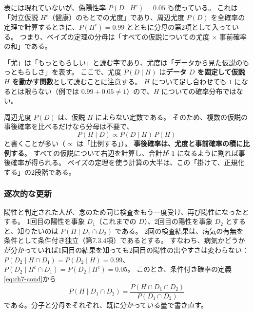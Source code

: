 表には現れていないが、偽陽性率 $P(D \mid H^c) = 0.05$ も使っている。
これは「対立仮説 $H^c$（健康）のもとでの尤度」であり、周辺尤度 $P(D)$ を全確率の定理で計算するときに、$P(H^c) = 0.99$ とともに分母の第2項として入っている。
つまり、ベイズの定理の分母は「すべての仮説についての尤度 $\times$ 事前確率の和」である。

「尤」は「もっともらしい」と読む字であり、尤度は「データから見た仮説のもっともらしさ」を表す。
ここで、尤度 $P(D \mid H)$ は\textbf{データ $D$ を固定して仮説 $H$ を動かす関数}として読むことに注意する。
$H$ について足し合わせても $1$ になるとは限らない（例では $0.99 + 0.05 \neq 1$）ので、$H$ についての確率分布ではない。

周辺尤度 $P(D)$ は、仮説 $H$ によらない定数である。
そのため、複数の仮説の事後確率を比べるだけなら分母は不要で、
\begin{equation}
  P(H \mid D) \propto P(D \mid H)\,P(H)
  \label{eq:ch7-bayes-prop}
\end{equation}
と書くことが多い（$\propto$ は「比例する」）。
\textbf{事後確率は、尤度と事前確率の積に比例する}。
すべての仮説について右辺を計算し、合計が $1$ になるように割れば事後確率が得られる。
ベイズの定理を使う計算の大半は、この「掛けて、正規化する」の2段階である。

\subsubsection{逐次的な更新}

陽性と判定された人が、念のため同じ検査をもう一度受け、再び陽性になったとする。
1回目の陽性を事象 $D_1$（これまでの $D$）、2回目の陽性を事象 $D_2$ とすると、知りたいのは $P(H \mid D_1 \cap D_2)$ である。
2回の検査結果は、病気の有無を条件として条件付き独立（第7.3.4項）であるとする。
すなわち、病気かどうかが分かっていれば1回目の結果を知っても2回目の陽性の出やすさは変わらない：
$P(D_2 \mid H \cap D_1) = P(D_2 \mid H) = 0.99$、$P(D_2 \mid H^c \cap D_1) = P(D_2 \mid H^c) = 0.05$。
このとき、条件付き確率の定義\eqref{eq:ch7-cond}から
\begin{equation}
  P(H \mid D_1 \cap D_2) = \frac{P(H \cap D_1 \cap D_2)}{P(D_1 \cap D_2)}
  \label{eq:ch7-seq-def}
\end{equation}
である。分子と分母をそれぞれ、既に分かっている量で書き直す。

